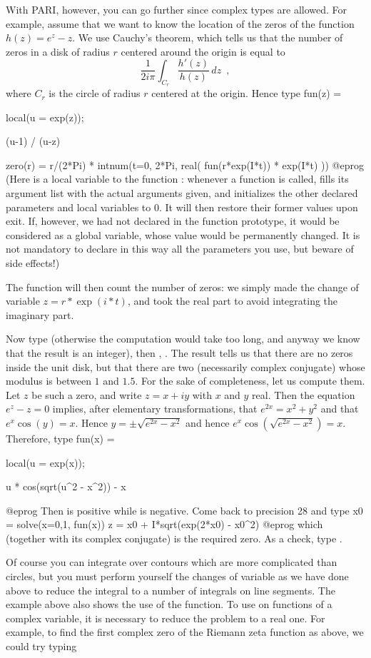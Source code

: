 With PARI, however, you can go further since complex types are allowed.
For example, assume that we want to know the location of the zeros of the
function $h(z)=e^z-z$. We use Cauchy's theorem, which tells us that the
number of zeros in a disk of radius $r$ centered around the origin is
equal to
$$\dfrac{1}{2i\pi}\int_{C_r}\dfrac{h'(z)}{h(z)}\,dz\enspace,$$
where $C_r$ is the circle of radius $r$ centered at the origin.
Hence type
\bprog
fun(z) =
{ local(u = exp(z));

  (u-1) / (u-z)
}
zero(r) = r/(2*Pi) * intnum(t=0, 2*Pi, real( fun(r*exp(I*t)) * exp(I*t) ))
@eprog
\noindent (Here  is a local variable to the function : whenever
a function is called,  fills its argument list with the actual arguments
given, and initializes the other declared parameters and local variables to
0. It will then restore their former values upon exit. If, however, we had
not declared  in the function prototype, it would be considered as a
global variable, whose value would be permanently changed. It is not
mandatory to declare in this way all the parameters you use, but beware of
side effects!)

The function  will then count the number of zeros: we simply
made the change of variable $z = r*\exp(i*t)$, and took the real part to
avoid integrating the imaginary part.

Now type  (otherwise the computation would take too long, and
anyway we know that the result is an integer), then ,
. The result tells us that there are no zeros inside the unit
disk, but that there are two (necessarily complex conjugate) whose modulus is
between $1$ and $1.5$. For the sake of completeness, let us compute them. Let
$z$ be such a zero, and write $z=x+iy$ with $x$ and $y$ real. Then the
equation $e^z-z=0$ implies, after elementary transformations, that
$e^{2x}=x^2+y^2$ and that $e^x\cos(y)=x$. Hence $y=\pm\sqrt{e^{2x}-x^2}$ and
hence $e^x\cos(\sqrt{e^{2x}-x^2})=x$. Therefore, type 
\bprog
fun(x) =
{ local(u = exp(x));

  u * cos(sqrt(u^2 - x^2)) - x
}
@eprog
\noindent Then  is positive while  is negative. Come
back to precision 28 and type
\bprog
  x0 = solve(x=0,1, fun(x))
  z = x0 + I*sqrt(exp(2*x0) - x0^2)
@eprog
\noindent which (together with its complex conjugate) is the required zero.
As a check, type .

Of course you can integrate over contours which are more complicated than
circles, but you must perform yourself the changes of variable as we have
done above to reduce the integral to a number of integrals on line segments.
\smallskip
%
The example above also shows the use of the  function. To use
 on functions of a complex variable, it is necessary to reduce the
problem to a real one. For example, to find the first complex zero of the
Riemann zeta function as above, we could try typing

